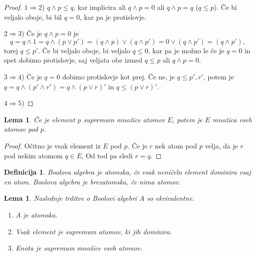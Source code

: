 \documentclass{amsart}
\newtheorem{lema}[izrek]{Lema}
\newtheorem{definicija}[izrek]{Definicija}
\begin{document}
\begin{proof} 
    \(1 \Rightarrow 2\)) \(q \wedge p \leq q\), kar implicira ali
    \(q \wedge p = 0\) ali \(q \wedge p = q\) (\(q \leq p\)). Če bi veljalo oboje, bi bil
    $q = 0$, kar pa je protislovje. 

    \(2 \Rightarrow 3\)) Če je \(q \wedge p = 0\) je 
    \[q = q \wedge 1 = q \wedge \left(p \vee p'\right) = \left(q \wedge p\right)
    \vee \left(q \wedge p'\right) = 0 \vee \left(q \wedge p'\right) = 
    \left(q \wedge p'\right),\]
    torej \(q \leq p'\). Če bi veljalo oboje, bi veljalo \(q \leq 0\), kar pa je možno le če 
    je $q = 0$ in spet dobimo protislovje, saj veljata obe izmed \(q \leq p\) ali \(q \wedge p = 0\).

    \(3 \Rightarrow 4\)) Če je \(q = 0\) dobimo protislovje kot prej. Če ne, je \(q \leq p', r'\), potem je 
    \(q = q \wedge (p' \wedge r') = q \wedge (p \vee r)'\) in \(q \leq (p \vee r)'\).

    \(4 \Rightarrow 5\))

\end{proof}

\begin{lema}
    Če je element \(p\) supremum množice atomov \(E\), potem je \(E\) množica vseh atomov pod \(p\).
\end{lema}

\begin{proof}
    Očitno je vsak element iz $E$ pod $p$. 
    Če je $r$ nek atom pod $p$ velja, da je $r$ pod nekim atomom \(q \in E\),
    Od tod pa sledi $r = q$.
\end{proof}


\begin{definicija}
    Boolova algebra je atomska, če vsak neničeln element dominira vsaj en atom. 
    Boolova algebra je brezatomska, če nima atomov.
\end{definicija}

\begin{lema}
    Naslednje trditve o Boolovi algebri \(A\) so ekvivalentne.
    \begin{enumerate}
        \item A je atomska.
        \item Vsak element je supremum atomov, ki jih dominira.
        \item Enota je supremum množice vseh atomov.
    \end{enumerate}
\end{lema}
\end{document}
